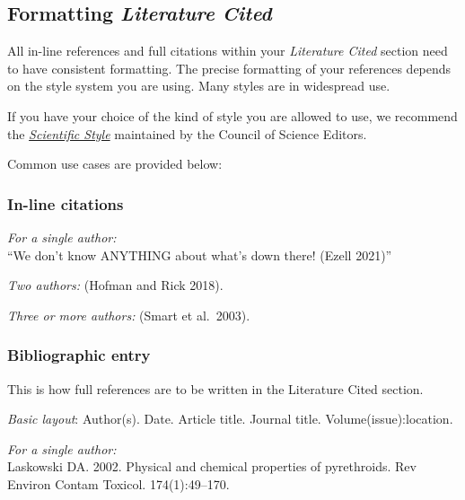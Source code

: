 \documentclass[]{book}
\begin{document}
\hypertarget{formatting-literature-cited}{%
\subsection*{\texorpdfstring{Formatting \emph{Literature Cited}}{Formatting Literature Cited}}\label{formatting-literature-cited}}

All in-line references and full citations within your \emph{Literature Cited} section need to have consistent formatting. The precise formatting of your references depends on the style system you are using. Many styles are in widespread use.

If you have your choice of the kind of style you are allowed to use, we recommend the \href{https://www.scientificstyleandformat.org/Tools/SSF-Citation-Quick-Guide.html}{\emph{Scientific Style}} maintained by the Council of Science Editors.

Common use cases are provided below:

\hypertarget{in-line-citations}{%
\subsubsection*{In-line citations}\label{in-line-citations}}

\emph{For a single author:}\\
``We don't know ANYTHING about what's down there! (Ezell 2021)''

\emph{Two authors:} (Hofman and Rick 2018).

\emph{Three or more authors:} (Smart et al.~2003).

\hypertarget{bibliographic-entry}{%
\subsubsection*{Bibliographic entry}\label{bibliographic-entry}}

This is how full references are to be written in the Literature Cited section.

\emph{Basic layout}: Author(s). Date. Article title. Journal title. Volume(issue):location.

\emph{For a single author:}\\
Laskowski DA. 2002. Physical and chemical properties of pyrethroids. Rev Environ Contam Toxicol. 174(1):49--170.
\end{document}
